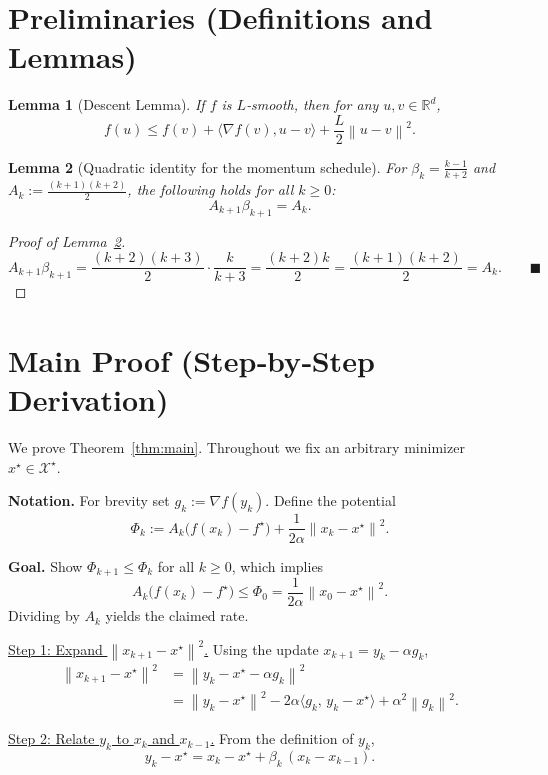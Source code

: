 \documentclass{article}
\newtheorem{lemma}{Lemma}
\newcommand{\norm}[1]{\left\|#1\right\|}
\newcommand{\grad}{\nabla}
\newcommand{\R}{\mathbb{R}}
\begin{document}
\section*{Preliminaries (Definitions and Lemmas)}
\begin{lemma}[Descent Lemma]\label{lem:descent}
If $f$ is $L$‑smooth, then for any $u,v\in\R^d$,
\[
f(u)\le f(v)+\langle \grad f(v),u-v\rangle+\frac{L}{2}\norm{u-v}^2 .
\]
\end{lemma}
\begin{lemma}[Quadratic identity for the momentum schedule]\label{lem:beta}
For $\beta_k=\frac{k-1}{k+2}$ and $A_k:=\frac{(k+1)(k+2)}{2}$, the following holds for all $k\ge0$:
\[
A_{k+1}\beta_{k+1}=A_k .
\]
\end{lemma}
\begin{proof}[Proof of Lemma~\ref{lem:beta}]
\[
A_{k+1}\beta_{k+1}
= \frac{(k+2)(k+3)}{2}\cdot\frac{k}{k+3}
= \frac{(k+2)k}{2}
= \frac{(k+1)(k+2)}{2}=A_k .
\qquad\blacksquare
\]
\end{proof}

\section*{Main Proof (Step‑by‑Step Derivation)}
We prove Theorem~\ref{thm:main}.  Throughout we fix an arbitrary minimizer
$x^\star\in\mathcal{X}^\star$.

\noindent\textbf{Notation.}  For brevity set $g_k:=\grad f(y_k)$.
Define the potential
\[
\Phi_k := A_k\bigl(f(x_k)-f^\star\bigr)+\frac{1}{2\alpha}\norm{x_k-x^\star}^2 .
\tag{1}
\]

\noindent\textbf{Goal.}  Show $\Phi_{k+1}\le \Phi_k$ for all $k\ge0$, which implies
\[
A_k\bigl(f(x_k)-f^\star\bigr)\le \Phi_0
= \frac{1}{2\alpha}\norm{x_0-x^\star}^2 .
\tag{2}
\]
Dividing by $A_k$ yields the claimed rate.

\bigskip
\noindent\underline{Step 1: Expand $\norm{x_{k+1}-x^\star}^2$.}  
Using the update $x_{k+1}=y_k-\alpha g_k$,
\[
\begin{aligned}
\norm{x_{k+1}-x^\star}^2
&= \norm{y_k-x^\star-\alpha g_k}^2\\
&= \norm{y_k-x^\star}^2-2\alpha\langle g_k,\,y_k-x^\star\rangle
      +\alpha^2\norm{g_k}^2 .
\end{aligned}
\tag{3}
\]

\noindent\underline{Step 2: Relate $y_k$ to $x_k$ and $x_{k-1}$.}  
From the definition of $y_k$,
\[
y_k-x^\star = x_k-x^\star + \beta_k\,(x_k-x_{k-1}) .
\tag{4}
\]
\end{document}
